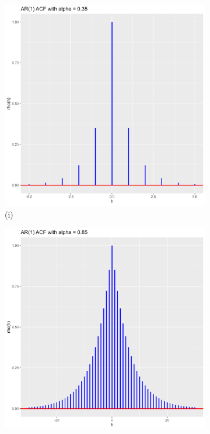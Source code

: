 \documentclass[11pt, a4paper]{article}
\begin{document}
\newpage

\begin{figure}[h!]
  \centering
  \begin{subfigure}[t]{0.3\textwidth}
    \includegraphics[width=\linewidth]{alpha_0.35.png}
    \caption*{(i)}
  \end{subfigure}
  \hfill
  \begin{subfigure}[t]{0.3\textwidth}
    \includegraphics[width=\linewidth]{alpha_0.85.png}

\end{subfigure}
\end{figure}
\end{document}
